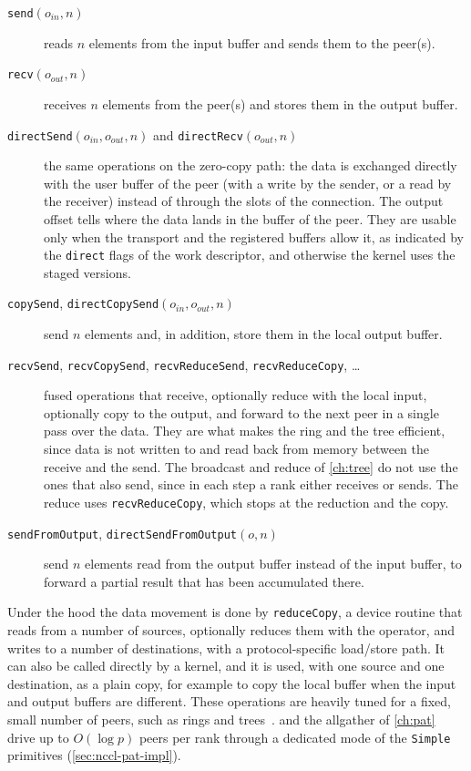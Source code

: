 \begin{description}
  \item[\texttt{send}$(o_{in},n)$] reads $n$ elements from the input buffer and sends them to the peer(s).
  \item[\texttt{recv}$(o_{out},n)$] receives $n$ elements from the peer(s) and stores them in the output buffer.
  \item[\texttt{directSend}$(o_{in},o_{out},n)$ and \texttt{directRecv}$(o_{out},n)$] the same operations on the zero-copy path: the data is exchanged directly with the user buffer of the peer (with a write by the sender, or a read by the receiver) instead of through the slots of the connection. The output offset tells where the data lands in the buffer of the peer. They are usable only when the transport and the registered buffers allow it, as indicated by the \texttt{direct} flags of the work descriptor, and otherwise the kernel uses the staged versions.
  \item[\texttt{copySend}, \texttt{directCopySend}$(o_{in},o_{out},n)$] send $n$ elements and, in addition, store them in the local output buffer.
  \item[\texttt{recvSend}, \texttt{recvCopySend}, \texttt{recvReduceSend}, \texttt{recvReduceCopy}, \dots] fused operations that receive, optionally reduce with the local input, optionally copy to the output, and forward to the next peer in a single pass over the data. They are what makes the ring and the tree efficient, since data is not written to and read back from memory between the receive and the send. The \bine{} broadcast and reduce of \cref{ch:tree} do not use the ones that also send, since in each step a rank either receives or sends. The reduce uses \texttt{recvReduceCopy}, which stops at the reduction and the copy.
  \item[\texttt{sendFromOutput}, \texttt{directSendFromOutput}$(o,n)$] send $n$ elements read from the output buffer instead of the input buffer, to forward a partial result that has been accumulated there.
\end{description}
Under the hood the data movement is done by \texttt{reduceCopy}, a device routine that reads from a number of sources, optionally reduces them with the operator, and writes to a number of destinations, with a protocol-specific load/store path.
It can also be called directly by a kernel, and it is used, with one source and one destination, as a plain copy, for example to copy the local buffer when the input and output buffers are different.
These operations are heavily tuned for a fixed, small number of peers, such as rings and trees~\cite{hu2025demystifying}. \pat{} and the \bine{} allgather of \cref{ch:pat} drive up to $O(\log p)$ peers per rank through a dedicated mode of the \texttt{Simple} primitives (\cref{sec:nccl-pat-impl}).

